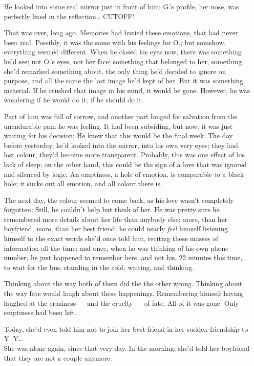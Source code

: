 He looked into some real mirror just in front of him; G.'s profile, her nose, was perfectly lined in the reflection\dots{}
CUTOFF!

That was over, long ago. 
Memories had buried these emotions, that had never been real. 
Possibly, it was the same with his feelings for O.; but somehow, everything seemed different. 
When he closed his eyes now, there was something he'd see; not O.'s eyes, not her face; something that belonged to her, something she'd remarked something about, the only thing he'd decided to ignore on purpose, and all the same the last image he'd kept of her. 
But it was something material. 
If he crushed that image in his mind, it would be gone. 
However, he was wondering if he would do it; if he should do it.

Part of him was full of sorrow, and another part longed for salvation from the unendurable pain he was feeling. 
It had been subsiding, but now, it was just waiting for his decision; He knew that this would be the final week. 
The day before yesterday, he'd looked into the mirror, into his own very eyes; they had lost colour, they'd become more transparent. 
Probably, this was one effect of his lack of sleep; on the other hand, this could be the sign of a love that was ignored and silenced by logic. 
An emptiness, a hole of emotion, is comparable to a black hole; it sucks out all emotion, and all colour there is.

The next day, the colour seemed to come back, as his love wasn't completely forgotten; Still, he couldn't help but think of her. 
He was pretty sure he remembered more details about her life than anybody else; more, than her boyfriend, more, than her best friend; he could nearly \emph{feel} himself listening himself to the exact words she'd once told him, reciting these masses of information all the time; and once, when he was thinking of his own phone number, he just happened to remember hers, and not his. 
22 minutes this time, to wait for the bus, standing in the cold; waiting, and thinking.

Thinking about the way both of them did the the other wrong. 
Thinking about the way fate would laugh about these happenings. 
Remembering himself having laughed at the craziness --- and the cruelty --- of fate. 
All of it was gone. 
Only emptiness had been left.

Today, she'd even told him not to join her best friend in her sudden friendship to Y. 
Y\dots{}\\
She was alone again, since that very day. 
In the morning, she'd told her boyfriend that they are not a couple anymore.

